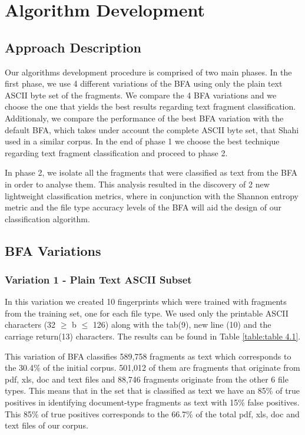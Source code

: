 \chapter{Algorithm Development}

\section{Approach Description}
Our algorithms development procedure is comprised of two main phases. In the first phase, we use 4 different variations of the BFA using only the plain text ASCII byte set of the fragments. We compare the 4 BFA variations and we choose the one that yields the best results regarding text fragment classification. Additionaly, we compare the performance of the best BFA variation with the default BFA, which takes under account the complete ASCII byte set, that Shahi\cite{Ashim} used in a similar corpus. In the end of phase 1 we choose the best technique regarding text fragment classification and proceed to phase 2.

In phase 2, we isolate all the fragments that were classified as text from the BFA in order to analyse them. This analysis resulted in the discovery of 2 new lightweight classification metrics, where in conjunction with the Shannon entropy\cite{Shannon} metric and the file type accuracy levels of the BFA will aid the design of our classification algorithm.
\FloatBarrier

\section{BFA Variations}

\subsection{Variation 1 - Plain Text ASCII Subset}

In this variation we created 10 fingerprints which were trained with fragments from the training set, one for each file type. We used only the printable ASCII characters (32 $\geq$  b $\leq$ 126) along with the tab(9), new line (10) and the carriage return(13) characters. The results can be found in Table \ref{table:table 4.1}.

 This variation of BFA classifies 589,758 fragments as text which corresponds to the 30.4\% of the initial corpus. 501,012 of them are fragments that originate from pdf, xls, doc and text files and 88,746 fragments originate from the other 6 file types. This means that in the set that is classified as text we have an 85\% of true positives in identifying document-type fragments as text with 15\% false positives. This 85\% of true positives corresponds to the 66.7\% of the total pdf, xls, doc and text files of our corpus.\\

